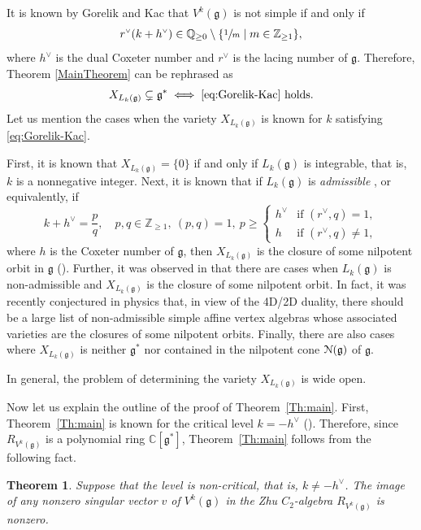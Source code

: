 \documentclass[11pt]{article}
\numberwithin{equation}{section}
\let\oldvee\vee
\renewcommand{\vee}{{\scriptscriptstyle\oldvee}}
\let\mathcal \EuScript
\newcommand\C{{\mathbb C}}
\newcommand\Q{{\mathbb Q}}
\newcommand\Z{{\mathbb Z}}
\newcommand \g{\mathfrak g}
\newtheorem{theorem}{Theorem}[section]
\theoremstyle{definition}
\begin{document}
It is known by Gorelik and Kac \cite{GorKac07}
that $V^k(\g)$
is not simple if and only if
\begin{equation}
r^{\vee}(k+h^{\vee}) \in \Q_{\geq 0}\setminus\{\sfrac{1}{m}\mid m\in \Z_{\geq 1}\},
\label{eq:Gorelik-Kac}
\end{equation}
where
$h^{\vee}$ is the dual Coxeter number and
$r^{\vee}$ is the lacing number of $\g$.
Therefore,
Theorem \ref{MainTheorem} can be rephrased as
\begin{equation}
X_{L_k(\g)}\subsetneq \g^*\iff \text{\eqref{eq:Gorelik-Kac} holds.}
\end{equation}
Let us mention the cases when the variety $X_{L_k(\g)}$
is known
for $k$ satisfying \eqref{eq:Gorelik-Kac}.

First, it is known \cite{Zhu96,DonMas06} that $X_{L_k(\g)}=\{0\}$
if and only if $L_k(\g)$ is integrable, that is,
$k$ is a nonnegative integer.
Next, it is known that if $L_k(\g)$ is \emph{admissible} \cite{KacWak89},
or equivalently,
if
\begin{equation*}
k+h^{\vee}=\frac{p}{q},\quad p,q\in \Z_{\geq 1}, \ (p,q)=1,\
p\geq \begin{cases}h^{\vee}&\text{if }(r^{\vee},q)=1,\\
h&\text{if }(r^{\vee},q)\ne 1,
\end{cases}
\end{equation*}
where $h$ is the Coxeter number of $\g$,
then
$X_{L_k(\g)}$ is the closure of some nilpotent orbit in $\g$ (\cite{Ara09b}).
Further, it was observed in \cite{AM15,AM17}
that
there are cases when $L_k(\g)$ is
non-admissible and
$X_{L_k(\g)}$ is the closure of some nilpotent orbit.
In fact,
it was recently
conjectured in physics \cite{XieYan2019lisse} that,
in view of the 4D/2D duality,
there should be
a large list of non-admissible simple affine vertex algebras
whose associated varieties are the closures of some nilpotent orbits.
Finally,
there are also cases \cite{AM16} where $X_{L_k(\g)}$
is neither $\g^*$ nor contained in the nilpotent cone $\mathcal{N}(\g)$
of $\g$.

In general,
the problem of determining the variety $X_{L_k(\g)}$ is wide open.

Now let us explain
the outline of
the proof of Theorem~\ref{Th:main}.
First, Theorem~\ref{Th:main} is known for the critical level $k=-h^\vee$
(\cite{FeiFre92,FreGai04}). Therefore, since $R_{V^k(\g)}$ is a polynomial ring $\C[\g^*]$,
Theorem~\ref{Th:main} follows from the following fact.
\begin{theorem}\label{theorem:image-of-the-singular}
Suppose that the level is non-critical, that is, $k\ne -h^\vee$.
The image of any nonzero singular vector $v$ of $V^k(\g)$
in the Zhu $C_2$-algebra $R_{V^k(\g)}$ is nonzero.
\end{theorem}
\end{document}
